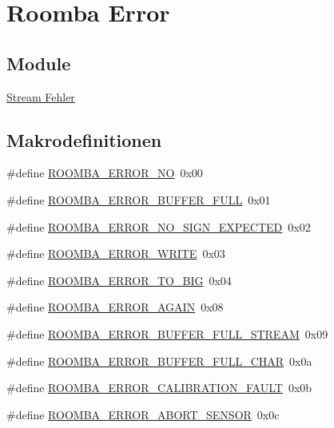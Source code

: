 \hypertarget{group__roomba__error}{\section{Roomba Error}
\label{group__roomba__error}
}
\subsection*{Module}
\begin{DoxyCompactItemize}
\item 
\hyperlink{group__roomba__error__stream}{Stream Fehler}
\end{DoxyCompactItemize}
\subsection*{Makrodefinitionen}
\begin{DoxyCompactItemize}
\item 
\#define \hyperlink{group__roomba__error_ga0a39892f929595e9e6dfff67ef25f593}{R\-O\-O\-M\-B\-A\-\_\-\-E\-R\-R\-O\-R\-\_\-\-N\-O}~0x00
\item 
\#define \hyperlink{group__roomba__error_ga3b04cf6a702280d61f12860ce3ce6263}{R\-O\-O\-M\-B\-A\-\_\-\-E\-R\-R\-O\-R\-\_\-\-B\-U\-F\-F\-E\-R\-\_\-\-F\-U\-L\-L}~0x01
\item 
\#define \hyperlink{group__roomba__error_ga576b76b11e017abce9f7ff99b4b7161e}{R\-O\-O\-M\-B\-A\-\_\-\-E\-R\-R\-O\-R\-\_\-\-N\-O\-\_\-\-S\-I\-G\-N\-\_\-\-E\-X\-P\-E\-C\-T\-E\-D}~0x02
\item 
\#define \hyperlink{group__roomba__error_ga05101b46c99b86cf46f59d1238ca7298}{R\-O\-O\-M\-B\-A\-\_\-\-E\-R\-R\-O\-R\-\_\-\-W\-R\-I\-T\-E}~0x03
\item 
\#define \hyperlink{group__roomba__error_ga685837574afe13c559db50cb9b5c012a}{R\-O\-O\-M\-B\-A\-\_\-\-E\-R\-R\-O\-R\-\_\-\-T\-O\-\_\-\-B\-I\-G}~0x04
\item 
\#define \hyperlink{group__roomba__error_gad35f7cffbb363514d9453cea041593e4}{R\-O\-O\-M\-B\-A\-\_\-\-E\-R\-R\-O\-R\-\_\-\-A\-G\-A\-I\-N}~0x08
\item 
\#define \hyperlink{group__roomba__error_gafb6db822e9e4a47ec7a987c717830202}{R\-O\-O\-M\-B\-A\-\_\-\-E\-R\-R\-O\-R\-\_\-\-B\-U\-F\-F\-E\-R\-\_\-\-F\-U\-L\-L\-\_\-\-S\-T\-R\-E\-A\-M}~0x09
\item 
\#define \hyperlink{group__roomba__error_ga5b9531ddf3975bb8be2529f61e9709cd}{R\-O\-O\-M\-B\-A\-\_\-\-E\-R\-R\-O\-R\-\_\-\-B\-U\-F\-F\-E\-R\-\_\-\-F\-U\-L\-L\-\_\-\-C\-H\-A\-R}~0x0a
\item 
\#define \hyperlink{group__roomba__error_ga225b79c08707c02fe85f6ab72a339270}{R\-O\-O\-M\-B\-A\-\_\-\-E\-R\-R\-O\-R\-\_\-\-C\-A\-L\-I\-B\-R\-A\-T\-I\-O\-N\-\_\-\-F\-A\-U\-L\-T}~0x0b
\item 
\#define \hyperlink{group__roomba__error_gaacd25ee9912b9e5c47373ac43eba1830}{R\-O\-O\-M\-B\-A\-\_\-\-E\-R\-R\-O\-R\-\_\-\-A\-B\-O\-R\-T\-\_\-\-S\-E\-N\-S\-O\-R}~0x0c
\end{DoxyCompactItemize}


